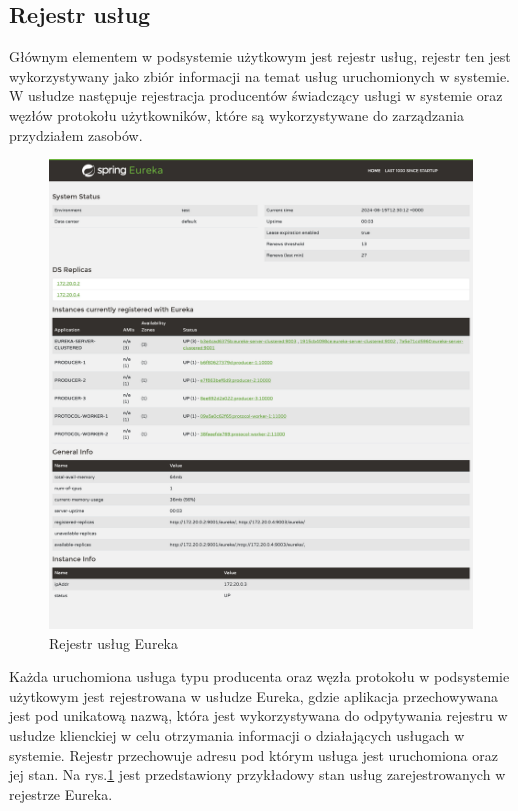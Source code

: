 \subsection{Rejestr usług}

Głównym elementem w podsystemie użytkowym jest rejestr usług, rejestr ten jest wykorzystywany jako zbiór informacji na temat usług uruchomionych w systemie. W usłudze następuje rejestracja producentów świadczący usługi w systemie oraz węzłów protokołu użytkowników, które są wykorzystywane do zarządzania przydziałem zasobów.

\begin{figure}[!htbp]
    \centering
    \includegraphics[width=\textwidth]{images/implementation/ServerDiscovery3Producer2Workers.png}
    \caption{Rejestr usług Eureka}
    \label{eurekaServerItems}
\end{figure}

Każda uruchomiona usługa typu producenta oraz węzła protokołu w podsystemie użytkowym jest rejestrowana w usłudze Eureka, gdzie aplikacja przechowywana jest pod unikatową nazwą, która jest wykorzystywana do odpytywania rejestru w usłudze klienckiej w celu otrzymania informacji o działających usługach w systemie. Rejestr przechowuje adresu pod którym usługa jest uruchomiona oraz jej stan. Na rys.\ref{eurekaServerItems} jest przedstawiony przykładowy stan usług zarejestrowanych w rejestrze Eureka.

